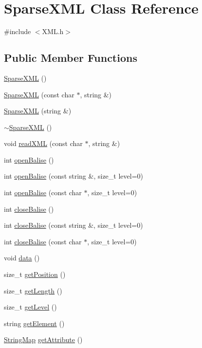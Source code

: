 \hypertarget{classSparseXML}{
\section{SparseXML Class Reference}
\label{d1/d7d/classSparseXML}
}


{\ttfamily \#include $<$XML.h$>$}

\subsection*{Public Member Functions}
\begin{DoxyCompactItemize}
\item 
\hyperlink{classSparseXML_ad1b8a88407254e3632b36f3a0c4da7f1}{SparseXML} ()
\item 
\hyperlink{classSparseXML_ab6de2e16edea99323f53562cbee2f909}{SparseXML} (const char $\ast$, string \&)
\item 
\hyperlink{classSparseXML_a2bf2cb132f6e066817ec5d709804c24f}{SparseXML} (string \&)
\item 
\hyperlink{classSparseXML_aaa0714db6ba81a7e8efe5e4696a98fd1}{$\sim$SparseXML} ()
\item 
void \hyperlink{classSparseXML_aeb150a7eb850552e50f0a1dd98744347}{readXML} (const char $\ast$, string \&)
\item 
int \hyperlink{classSparseXML_ac287a2d8e0acaeca2d808d6dad900dad}{openBalise} ()
\item 
int \hyperlink{classSparseXML_a7951cb73fecdb0612d3b9254dc65ba94}{openBalise} (const string \&, size\_\-t level=0)
\item 
int \hyperlink{classSparseXML_a82d150948d0c5eea1058aa6403d0195f}{openBalise} (const char $\ast$, size\_\-t level=0)
\item 
int \hyperlink{classSparseXML_a4ef5a928c307aa9d5bc8a4ef4f29345a}{closeBalise} ()
\item 
int \hyperlink{classSparseXML_a8db2b6a5ef6bbc97ac797e9336eeb0af}{closeBalise} (const string \&, size\_\-t level=0)
\item 
int \hyperlink{classSparseXML_a74fa1ce7aa7dd27476654dadd7bb0f4e}{closeBalise} (const char $\ast$, size\_\-t level=0)
\item 
void \hyperlink{classSparseXML_a6617ba3e856d8b24979a2a44e5417172}{data} ()
\item 
size\_\-t \hyperlink{classSparseXML_a2854d826b7e73f75720211e7ed28f58c}{getPosition} ()
\item 
size\_\-t \hyperlink{classSparseXML_a600073d563962412f8873bb598d52be7}{getLength} ()
\item 
size\_\-t \hyperlink{classSparseXML_a0ff60d882ca0e2fd5dcbe1c4aa445281}{getLevel} ()
\item 
string \hyperlink{classSparseXML_abad96f4e9f49fbbc12eca3c284f1b337}{getElement} ()
\item 
\hyperlink{FVLib__config_8h_a09af799878f7f9f2af8b7133bc151874}{StringMap} \hyperlink{classSparseXML_ab3f35e029da66b7fff57680e64719985}{getAttribute} ()
\end{DoxyCompactItemize}


